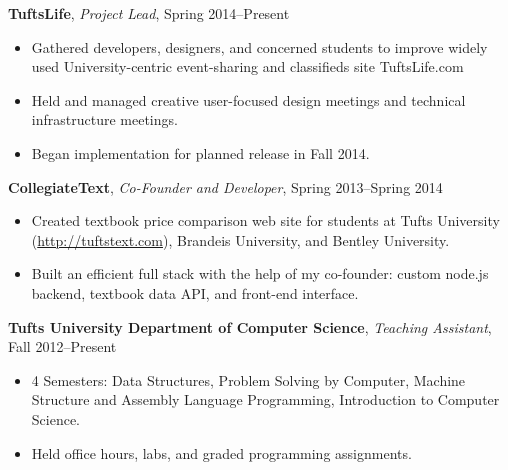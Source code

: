 \documentclass[10pt, letter]{article}
\newenvironment{list1}{
  \begin{list}{\ding{113}}{%
      \setlength{\itemsep}{0in}
      \setlength{\parsep}{0in} \setlength{\parskip}{0in}
      \setlength{\topsep}{0in} \setlength{\partopsep}{0in} 
      \setlength{\leftmargin}{0.17in}}}{\end{list}}
\begin{document}
\vspace{6pt}
{\bf TuftsLife}, \emph{Project Lead}, Spring 2014--Present\\
\vspace*{-.15in}
\begin{itemize}[topsep=0pt, itemsep=-1pt]
\item Gathered developers, designers, and concerned students to improve widely used University-centric event-sharing and classifieds site TuftsLife.com
\item Held and managed creative user-focused design meetings and technical infrastructure meetings.
\item Began implementation for planned release in Fall 2014.
\end{itemize}
\vspace{6pt}
{\bf CollegiateText}, {\em Co-Founder and Developer}, Spring 2013--Spring 2014\\
\vspace*{-.15in}
\begin{itemize}[topsep=0pt,itemsep=-1pt]
            \item Created textbook price comparison web site for students at Tufts University (\url{http://tuftstext.com}), Brandeis University, and Bentley University.
            \item Built an efficient full stack with the help of my co-founder: custom node.js backend, textbook data API, and front-end interface. 
        \end{itemize}
\vspace{6pt}
{\bf Tufts University Department of Computer Science}, {\em Teaching Assistant}, Fall 2012--Present\\
\vspace*{-.15in}
\begin{itemize}[topsep=0pt,itemsep=-1pt]
  \item 4 Semesters: Data Structures, Problem Solving by Computer, Machine Structure and Assembly Language Programming, Introduction to Computer Science.
  \item Held office hours, labs, and graded programming assignments.
\end{itemize}
\end{document}

